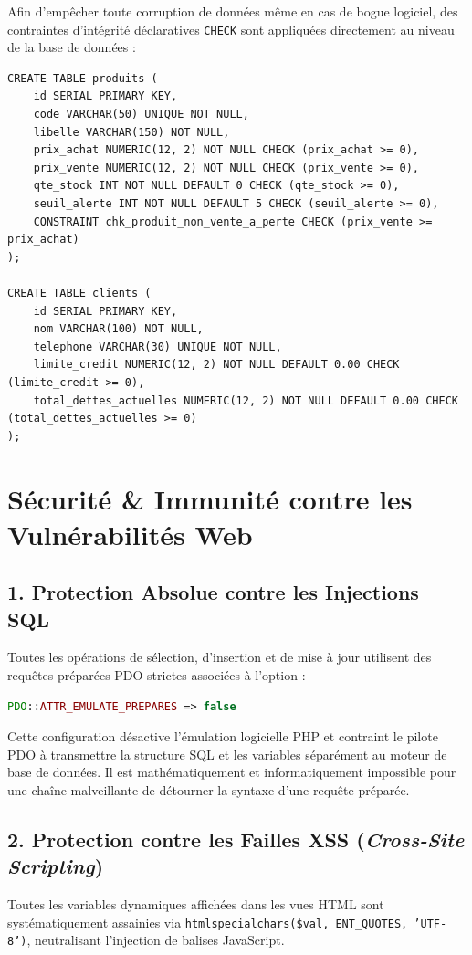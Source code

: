 \documentclass[11pt,a4paper,titlepage,twoside,openright]{report}
\begin{document}
Afin d'empêcher toute corruption de données même en cas de bogue logiciel, des contraintes d'intégrité déclaratives \texttt{CHECK} sont appliquées directement au niveau de la base de données :
\begin{lstlisting}[style=sqlstyle, caption={Extrait des contraintes d'intégrité CHECK dans schema.sql}]
CREATE TABLE produits (
    id SERIAL PRIMARY KEY,
    code VARCHAR(50) UNIQUE NOT NULL,
    libelle VARCHAR(150) NOT NULL,
    prix_achat NUMERIC(12, 2) NOT NULL CHECK (prix_achat >= 0),
    prix_vente NUMERIC(12, 2) NOT NULL CHECK (prix_vente >= 0),
    qte_stock INT NOT NULL DEFAULT 0 CHECK (qte_stock >= 0),
    seuil_alerte INT NOT NULL DEFAULT 5 CHECK (seuil_alerte >= 0),
    CONSTRAINT chk_produit_non_vente_a_perte CHECK (prix_vente >= prix_achat)
);

CREATE TABLE clients (
    id SERIAL PRIMARY KEY,
    nom VARCHAR(100) NOT NULL,
    telephone VARCHAR(30) UNIQUE NOT NULL,
    limite_credit NUMERIC(12, 2) NOT NULL DEFAULT 0.00 CHECK (limite_credit >= 0),
    total_dettes_actuelles NUMERIC(12, 2) NOT NULL DEFAULT 0.00 CHECK (total_dettes_actuelles >= 0)
);
\end{lstlisting}

\section{Sécurité \& Immunité contre les Vulnérabilités Web}

\subsection{1. Protection Absolue contre les Injections SQL}
Toutes les opérations de sélection, d'insertion et de mise à jour utilisent des requêtes préparées PDO strictes associées à l'option :
\begin{lstlisting}[language=PHP]
PDO::ATTR_EMULATE_PREPARES => false
\end{lstlisting}
Cette configuration désactive l'émulation logicielle PHP et contraint le pilote PDO à transmettre la structure SQL et les variables séparément au moteur de base de données. Il est mathématiquement et informatiquement impossible pour une chaîne malveillante de détourner la syntaxe d'une requête préparée.

\subsection{2. Protection contre les Failles XSS (\emph{Cross-Site Scripting})}
Toutes les variables dynamiques affichées dans les vues HTML sont systématiquement assainies via \texttt{htmlspecialchars(\$val, ENT\_QUOTES, 'UTF-8')}, neutralisant l'injection de balises JavaScript.
\end{document}
